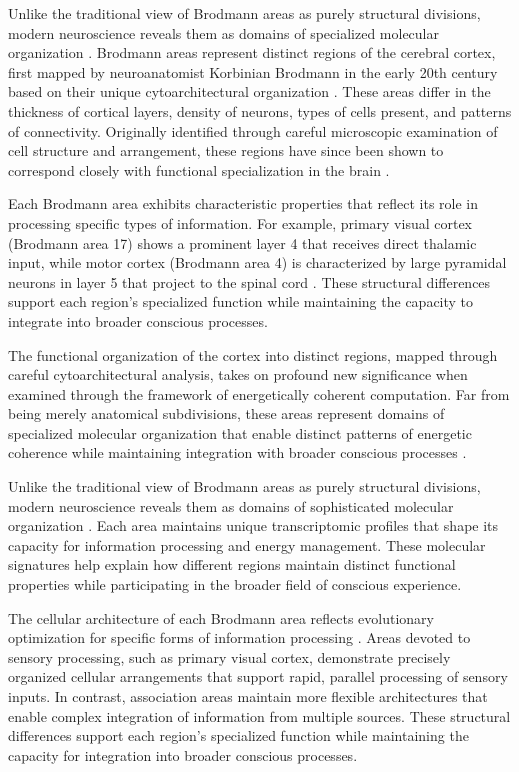 \begin{refsection}
Unlike the traditional view of Brodmann areas as purely structural divisions, modern neuroscience reveals them as domains of specialized molecular organization \cite{Amunts2007}. Brodmann areas represent distinct regions of the cerebral cortex, first mapped by neuroanatomist Korbinian Brodmann in the early 20th century based on their unique cytoarchitectural organization \cite{Brodmann1909}. These areas differ in the thickness of cortical layers, density of neurons, types of cells present, and patterns of connectivity. Originally identified through careful microscopic examination of cell structure and arrangement, these regions have since been shown to correspond closely with functional specialization in the brain \cite{Eickhoff2018}.

Each Brodmann area exhibits characteristic properties that reflect its role in processing specific types of information. For example, primary visual cortex (Brodmann area 17) shows a prominent layer 4 that receives direct thalamic input, while motor cortex (Brodmann area 4) is characterized by large pyramidal neurons in layer 5 that project to the spinal cord \cite{Zilles2010}. These structural differences support each region's specialized function while maintaining the capacity to integrate into broader conscious processes.

The functional organization of the cortex into distinct regions, mapped through careful cytoarchitectural analysis, takes on profound new significance when examined through the framework of energetically coherent computation. Far from being merely anatomical subdivisions, these areas represent domains of specialized molecular organization that enable distinct patterns of energetic coherence while maintaining integration with broader conscious processes \cite{Glasser2016}.

Unlike the traditional view of Brodmann areas as purely structural divisions, modern neuroscience reveals them as domains of sophisticated molecular organization \cite{Hawrylycz2012}. Each area maintains unique transcriptomic profiles that shape its capacity for information processing and energy management. These molecular signatures help explain how different regions maintain distinct functional properties while participating in the broader field of conscious experience.

The cellular architecture of each Brodmann area reflects evolutionary optimization for specific forms of information processing \cite{Palomero-Gallagher2019}. Areas devoted to sensory processing, such as primary visual cortex, demonstrate precisely organized cellular arrangements that support rapid, parallel processing of sensory inputs. In contrast, association areas maintain more flexible architectures that enable complex integration of information from multiple sources. These structural differences support each region's specialized function while maintaining the capacity for integration into broader conscious processes.


\end{refsection}
